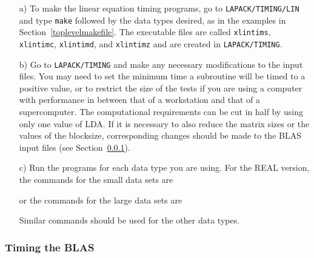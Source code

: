\begin{itemize}
\item[a)]
To make the linear equation timing programs,
go to {\tt LAPACK/TIMING/LIN} and type {\tt make} followed by the data
types desired, as in the examples in Section~\ref{toplevelmakefile}.
The executable files are called {\tt xlintims},
{\tt xlintimc}, {\tt xlintimd}, and {\tt xlintimz} and are created
in {\tt LAPACK/TIMING}.

\item[b)]
Go to {\tt LAPACK/TIMING} and
make any necessary modifications to the input files.
You may need to set the minimum time a subroutine will
be timed to a positive value, or to restrict the size of the tests
if you are using a computer with performance in between that of a
workstation and that of a supercomputer.
The computational requirements can be cut in half by using only one
value of LDA.
If it is necessary to also reduce the matrix sizes or the values of
the blocksize, corresponding changes should be made to the 
BLAS input files (see Section~\ref{timeblas}).

\item[c)]
Run the programs for each data type you are using. 
For the REAL version, the commands for the small data sets are

or the commands for the large data sets are

\noindent
Similar commands should be used for the other data types.
\end{itemize}

\subsubsection{Timing the BLAS}\label{timeblas}

